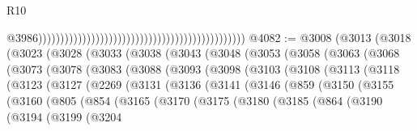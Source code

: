 \begin{lexlean}{R10}
\begin{coremodule}
                                                                                                  @3986)))))))))))))))))))))))))))))))))))))))))))))))
@4082 := @3008
    (@3013
      (@3018
        (@3023
          (@3028
            (@3033
              (@3038
                (@3043
                  (@3048
                    (@3053
                      (@3058
                        (@3063
                          (@3068
                            (@3073
                              (@3078
                                (@3083
                                  (@3088
                                    (@3093
                                      (@3098
                                        (@3103
                                          (@3108
                                            (@3113
                                              (@3118
                                                (@3123
                                                  (@3127
                                                    (@2269
                                                      (@3131
                                                        (@3136
                                                          (@3141
                                                            (@3146
                                                              (@859
                                                                (@3150
                                                                  (@3155
                                                                    (@3160
                                                                      (@805
                                                                        (@854
                                                                          (@3165
                                                                            (@3170
                                                                              (@3175
                                                                                (@3180
                                                                                  (@3185
                                                                                    (@864
                                                                                      (@3190
                                                                                        (@3194
                                                                                          (@3199
                                                                                            (@3204

\end{coremodule}
\end{lexlean}
